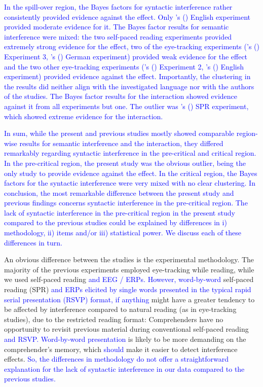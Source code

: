 \documentclass[a4paper, man, floatsintext]{apa7}
\begin{document}
{\textcolor{blue}{In the spill-over region, the Bayes factors for syntactic interference rather consistently provided evidence against the effect. Only \citeauthor{mertzen}'s (\citeyear{mertzen}) English experiment provided moderate evidence for it. The Bayes factor results for semantic interference were mixed: the two self-paced reading experiments provided extremely strong evidence for the effect, two of the eye-tracking experiments (\citeauthor{vandyke07}'s (\citeyear{vandyke07}) Experiment 3, \citeauthor{mertzen}'s (\citeyear{mertzen}) German experiment) provided weak evidence for the effect and the two other eye-tracking experiments (\citeauthor{vandyke07}'s (\citeyear{vandyke07}) Experiment 2, \citeauthor{mertzen}'s (\citeyear{mertzen}) English experiment) provided evidence against the effect. Importantly, the clustering in the results did neither align with the investigated language nor with the authors of the studies. The Bayes factor results for the interaction showed evidence against it from all experiments but one. The outlier was \citeauthor{vandyke07}'s (\citeyear{vandyke07}) SPR experiment, which showed extreme evidence for the interaction.}

\textcolor{blue}{In sum, while the present and previous studies mostly showed comparable region-wise results for semantic interference and the interaction, they differed remarkably regarding syntactic interference in the pre-critical and critical region. In the pre-critical region, the present study was the obvious outlier, being the only study to provide evidence against the effect. In the critical region, the Bayes factors for the syntactic interference were very mixed with no clear clustering. In conclusion, the most remarkable difference between the present study and previous findings concerns syntactic interference in the pre-critical region. The lack of syntactic interference in the pre-critical region in the present study compared to the previous studies could be explained by differences in i) methodology, ii) items and/or iii) statistical power. We discuss each of these differences in turn.}
}

An obvious difference between the studies is the experimental methodology. The majority of the previous experiments employed eye-tracking while reading, while we used self-paced reading \textcolor{blue}{and EEG / ERPs. However, word-by-word} self-paced reading (SPR) \textcolor{blue}{and ERPs elicited by single words presented in the typical rapid serial presentation (RSVP) format, if anything} might have a greater tendency to be affected by interference compared to natural reading (as in eye-tracking studies), due to the restricted reading format: Comprehenders have no opportunity to revisit previous material during conventional self-paced reading \citep[but see][]{BSPR} \textcolor{blue}{and RSVP. Word-by-word presentation} is likely to be more demanding on the comprehender's memory, which \textcolor{blue}{should} make it easier to detect interference effects. \textcolor{blue}{So, the differences in methodology do not offer a straightforward explanation for the lack of syntactic interference in our data compared to the previous studies.}
\end{document}
